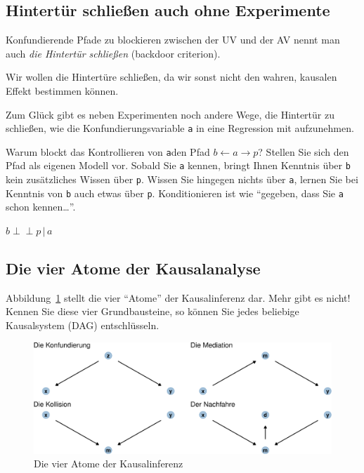 \documentclass[
  a4paper,
  DIV=11]{scrreprt}
\theoremstyle{definition}
\theoremstyle{remark}
\begin{document}
\hypertarget{hintertuxfcr-schlieuxdfen-auch-ohne-experimente}{%
\subsection{Hintertür schließen auch ohne
Experimente}\label{hintertuxfcr-schlieuxdfen-auch-ohne-experimente}}

Konfundierende Pfade zu blockieren zwischen der UV und der AV nennt man
auch \emph{die Hintertür schließen} (backdoor criterion).

Wir wollen die Hintertüre schließen, da wir sonst nicht den wahren,
kausalen Effekt bestimmen können.

Zum Glück gibt es neben Experimenten noch andere Wege, die Hintertür zu
schließen, wie die Konfundierungsvariable \texttt{a} in eine Regression
mit aufzunehmen.

Warum blockt das Kontrollieren von \texttt{a}den Pfad
\(b \leftarrow a \rightarrow p\)? Stellen Sie sich den Pfad als eigenen
Modell vor. Sobald Sie \texttt{a} kennen, bringt Ihnen Kenntnis über
\texttt{b} kein zusätzliches Wissen über \texttt{p}. Wissen Sie hingegen
nichts über \texttt{a}, lernen Sie bei Kenntnis von \texttt{b} auch
etwas über \texttt{p}. Konditionieren ist wie ``gegeben, dass Sie
\texttt{a} schon kennen\ldots{}''.

\(b \perp \!\!\! \perp p \,|\,a\)

\hypertarget{die-vier-atome-der-kausalanalyse}{%
\subsection{Die vier Atome der
Kausalanalyse}\label{die-vier-atome-der-kausalanalyse}}

Abbildung~\ref{fig-four-atoms} stellt die vier ``Atome'' der
Kausalinferenz dar. Mehr gibt es nicht! Kennen Sie diese vier
Grundbausteine, so können Sie jedes beliebige Kausalsystem (DAG)
entschlüsseln.

\begin{figure}

{\centering \includegraphics{./kausal_files/figure-pdf/fig-four-atoms-1.pdf}

}

\caption{\label{fig-four-atoms}Die vier Atome der Kausalinferenz}

\end{figure}
\end{document}
